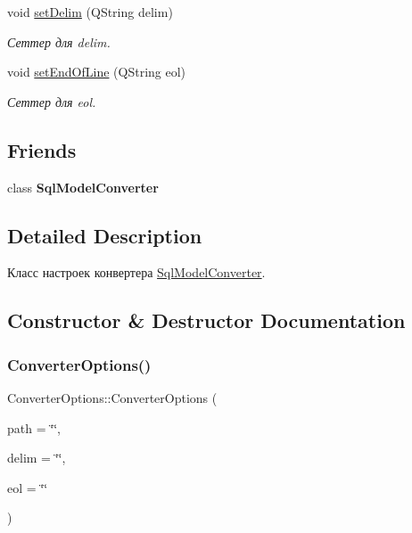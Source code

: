 \begin{DoxyCompactItemize}
void \hyperlink{class_converter_options_a5fa443d5b4b85ae865df5e7e242427d9}{set\+Delim} (Q\+String delim)
\begin{DoxyCompactList}\small\item\em Сеттер для delim. \end{DoxyCompactList}\item 
void \hyperlink{class_converter_options_ad536240705b539c58323240ca5bc1f5c}{set\+End\+Of\+Line} (Q\+String eol)
\begin{DoxyCompactList}\small\item\em Сеттер для eol. \end{DoxyCompactList}\end{DoxyCompactItemize}
\subsection*{Friends}
\begin{DoxyCompactItemize}
\item 
\mbox{\label{class_converter_options_ac2834b7186dba9c25da67cb842f271f1}} 
class {\bfseries Sql\+Model\+Converter}
\end{DoxyCompactItemize}


\subsection{Detailed Description}
Класс настроек конвертера \hyperlink{class_sql_model_converter}{Sql\+Model\+Converter}. 

\subsection{Constructor \& Destructor Documentation}
\mbox{\label{class_converter_options_a99308bb0a82b2f0436a7236ffe1248b0}} 
\subsubsection{\texorpdfstring{Converter\+Options()}{ConverterOptions()}}
{\footnotesize\ttfamily Converter\+Options\+::\+Converter\+Options (\begin{DoxyParamCaption}\item[{Q\+String}]{path = {\ttfamily \char`\"{}\char`\"{}},  }\item[{Q\+String}]{delim = {\ttfamily \char`\"{}\char`\"{}},  }\item[{Q\+String}]{eol = {\ttfamily \char`\"{}\char`\"{}} }\end{DoxyParamCaption})\hspace{0.3cm}{\ttfamily [inline]}}



